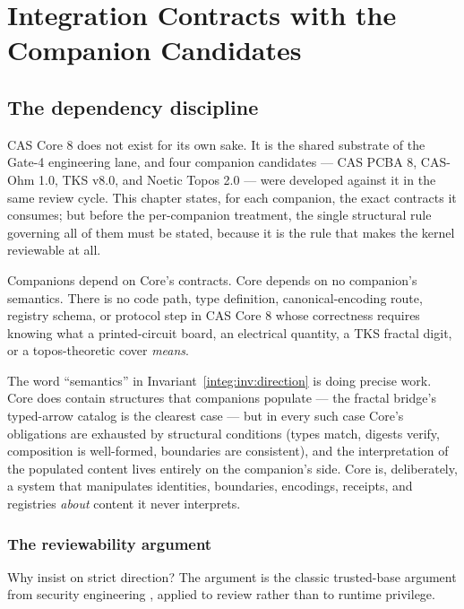 \chapter{Integration Contracts with the Companion Candidates}\label{integ:chapter}

\section{The dependency discipline}\label{integ:discipline}

CAS Core 8 does not exist for its own sake. It is the shared substrate of the Gate-4 engineering lane, and four companion candidates --- CAS PCBA 8, CAS-Ohm 1.0, TKS v8.0, and Noetic Topos 2.0 --- were developed against it in the same review cycle. This chapter states, for each companion, the exact contracts it consumes; but before the per-companion treatment, the single structural rule governing all of them must be stated, because it is the rule that makes the kernel reviewable at all.

\begin{invariant}\label{integ:inv:direction}
Companions depend on Core's contracts. Core depends on no companion's semantics. There is no code path, type definition, canonical-encoding route, registry schema, or protocol step in CAS Core 8 whose correctness requires knowing what a printed-circuit board, an electrical quantity, a TKS fractal digit, or a topos-theoretic cover \emph{means}.
\end{invariant}

The word ``semantics'' in Invariant~\ref{integ:inv:direction} is doing precise work. Core does contain structures that companions populate --- the fractal bridge's typed-arrow catalog is the clearest case --- but in every such case Core's obligations are exhausted by structural conditions (types match, digests verify, composition is well-formed, boundaries are consistent), and the interpretation of the populated content lives entirely on the companion's side. Core is, deliberately, a system that manipulates identities, boundaries, encodings, receipts, and registries \emph{about} content it never interprets.

\subsection{The reviewability argument}\label{integ:reviewability}

Why insist on strict direction? The argument is the classic trusted-base argument from security engineering \cite{anderson}, applied to review rather than to runtime privilege.

